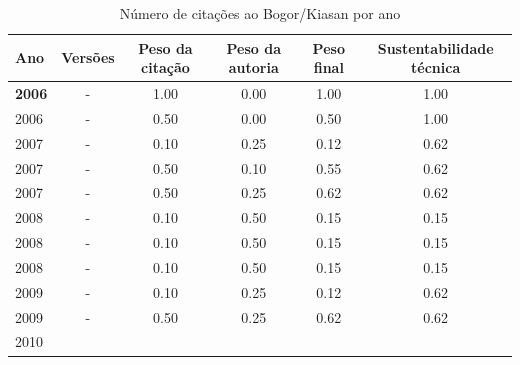 \begin{table}[H]
\caption{Número de citações ao Bogor/Kiasan por ano}
\centering
\begin{tabular}{| l | c | c | c | c | c |}
  \hline
  Ano & Versões & Peso da citação & Peso da autoria & Peso final & Sustentabilidade técnica \\
  \hline
            {\bf 2006}
          &
          -
          &
          1.00
          &
          0.00
          &
          1.00
          &
            {\color{blue} 1.00}
          \\
            2006
          &
          -
          &
          0.50
          &
          0.00
          &
          0.50
          &
            {\color{blue} 1.00}
          \\
\hline
            2007
          &
          -
          &
          0.10
          &
          0.25
          &
          0.12
          &
            {\color{blue} 0.62}
          \\
            2007
          &
          -
          &
          0.50
          &
          0.10
          &
          0.55
          &
            {\color{blue} 0.62}
          \\
            2007
          &
          -
          &
          0.50
          &
          0.25
          &
          0.62
          &
            {\color{blue} 0.62}
          \\
\hline
            2008
          &
          -
          &
          0.10
          &
          0.50
          &
          0.15
          &
            {\color{red} 0.15}
          \\
            2008
          &
          -
          &
          0.10
          &
          0.50
          &
          0.15
          &
            {\color{red} 0.15}
          \\
            2008
          &
          -
          &
          0.10
          &
          0.50
          &
          0.15
          &
            {\color{red} 0.15}
          \\
\hline
            2009
          &
          -
          &
          0.10
          &
          0.25
          &
          0.12
          &
            {\color{blue} 0.62}
          \\
            2009
          &
          -
          &
          0.50
          &
          0.25
          &
          0.62
          &
            {\color{blue} 0.62}
          \\
\hline
            2010
          &

\end{tabular}
\end{table}
